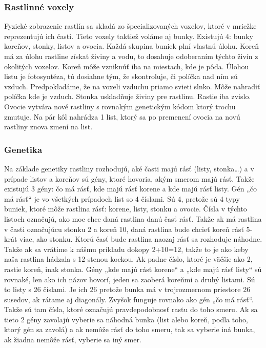 \documentclass[12pt]{article}
\begin{document}
\subsubsection{Rastlinné voxely}

Fyzické zobrazenie rastlín sa skladá zo špecializovaných voxelov, ktoré
v mriežke reprezentujú ich časti. Tieto voxely taktiež voláme aj bunky.
Existujú 4: bunky koreňov, stonky, listov a ovocia. Každá skupina buniek plní
vlastnú úlohu. Koreň má za úlohu rastline získať živiny a vodu, to dosahuje
odoberaním týchto živín z okolitých voxelov. Koreň môže vzniknúť iba na
miestach, kde je pôda. Úlohou listu je fotosyntéza, tú dosiahne tým, že
skontroluje, či políčka nad ním sú vzduch. Predpokladáme, že na voxeli vzduchu
priamo svieti slnko. Môže nahradiť políčka kde je vzduch. Stonka uskladňuje
živiny pre rastlinu.  Rastie iba zvislo. Ovocie vytvára nové rastliny
s rovnakým genetickým kódom ktorý trochu zmutuje. Na pár kôl nahrádza 1 list,
ktorý sa po premenení ovocia na novú rastliny znova zmení na list.

\subsubsection{Genetika}

Na základe genetiky rastliny rozhodujú, aké časti majú rásť (listy, stonka…)
a v prípade listov a koreňov sú gény, ktoré hovoria, akým smerom majú rásť.
Takže existujú 3 gény: čo má rásť, kde majú rásť korene a kde majú rásť listy.
Gén „čo má rásť“ je vo všetkých prípadoch list so 4 číslami. Sú 4, pretože sú 4
typy buniek, ktoré môže rastlina rásť: korene, listy, stonku a ovocie. Čísla
v týchto listoch označujú, ako moc chce daná rastlina danú časť rásť. Takže
ak má rastlina v časti označujúcu stonku 2 a koreň 10, daná rastlina bude
chcieť koreň rásť 5-krát viac, ako stonku. Ktorú časť bude rastlina naozaj
rásť sa rozhoduje náhodne. Takže ak sa vrátime k nášmu príkladu dokopy 2+10=12,
takže to je ako keby naša rastlina hádzala s 12-stenou kockou. Ak padne číslo,
ktoré je väčšie ako 2, rastie koreň, inak stonka. Gény „kde majú rásť korene“
a „kde majú rásť listy“ sú rovnaké, len ako ich názov hovorí, jeden sa zaoberá
koreňmi a druhý listami. Sú to listy s 26 číslami. Je ich 26 pretože bunka má
v trojrozmernom priestore 26 susedov, ak rátame aj diagonály. Zvyšok funguje
rovnako ako gén „čo má rásť“. Takže sú tam čísla, ktoré označujú
pravdepodobnosť rastu do toho smeru. Ak sa tieto 2 gény zavolajú vyberie
sa náhodná bunka (list alebo koreň, podla toho, ktorý gén sa zavolá) a ak
nemôže rásť do toho smeru, tak sa vyberie iná bunka, ak žiadna nemôže rásť,
vyberie sa iný smer.
\end{document}
